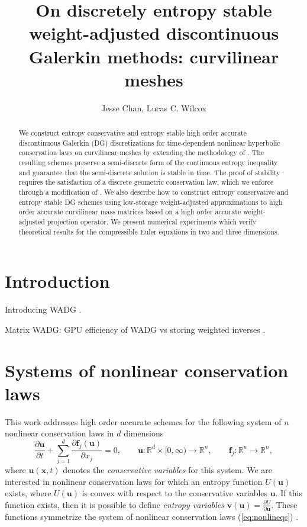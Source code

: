 \documentclass[preprint,10pt]{article}
\date{}
\author{Jesse Chan, Lucas C. Wilcox}
\title{On discretely entropy stable weight-adjusted discontinuous Galerkin methods: curvilinear meshes}%
\theoremstyle{definition}
\theoremstyle{lemma}
\theoremstyle{theorem}
\theoremstyle{assumption}
\newcommand{\pd}[2]{\frac{\partial#1}{\partial#2}}
\begin{document}
\maketitle

\begin{abstract}
We construct entropy conservative and entropy stable high order accurate discontinuous Galerkin (DG) discretizations for time-dependent nonlinear hyperbolic conservation laws on curvilinear meshes by extending the methodology of \cite{chan2017discretely}.  The resulting schemes preserve a semi-discrete form of the continuous entropy inequality and guarantee that the semi-discrete solution is stable in time.  The proof of stability requires the satisfaction of a discrete geometric conservation law, which we enforce through a modification of \cite{kopriva2006metric}.  We also describe how to construct entropy conservative and entropy stable DG schemes using low-storage weight-adjusted approximations to high order accurate curvilinear mass matrices \cite{chan2016weight1, chan2016weight2} based on a high order accurate weight-adjusted projection operator.  We present numerical experiments which verify theoretical results for the compressible Euler equations in two and three dimensions.
\end{abstract}

\tableofcontents

\section{Introduction}

Introducing WADG \cite{chan2016weight1,chan2016weight2}.  

Matrix WADG: GPU efficiency of WADG vs storing weighted inverses \cite{chan2017weight}.  

\section{Systems of nonlinear conservation laws}

This work addresses high order accurate schemes for the following system of $n$ nonlinear conservation laws in $d$ dimensions 
\begin{equation}
  \pd{\bm{u}}{t} + \sum_{j=1}^d\pd{\bm{f}_j(\bm{u})}{x_j}  = 0, \qquad \bm{u} : \mathbb{R}^d \times [0,\infty) \rightarrow  \mathbb{R}^n, \qquad \bm{f}_j : \mathbb{R}^n\rightarrow \mathbb{R}^n,
\label{eq:nonlineqs}
\end{equation}
where $\bm{u}(\bm{x},t)$ denotes the \emph{conservative variables} for this system.  %
We are interested in nonlinear conservation laws for which an entropy function $U(\bm{u})$ exists, where $U(\bm{u})$ is convex with respect to the conservative variables $\bm{u}$.  If this function exists, then it is possible to define \emph{entropy variables} $\bm{v}(\bm{u}) = \pd{U}{\bm{u}}$.  These functions symmetrize the system of nonlinear conservation laws (\ref{eq:nonlineqs}) \cite{hughes1986new}.  
\end{document}
